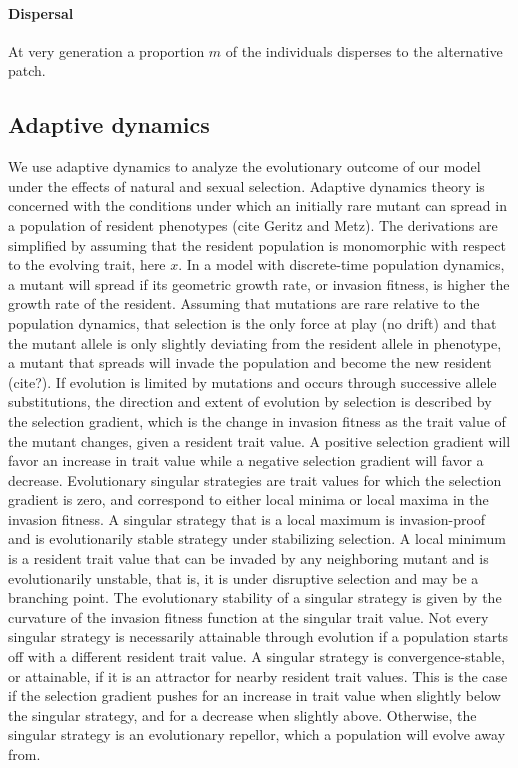 \paragraph{Dispersal} At very generation a proportion $m$ of the individuals disperses to the alternative patch.

\subsection*{Adaptive dynamics}

We use adaptive dynamics to analyze the evolutionary outcome of our model under the effects of natural and sexual selection. Adaptive dynamics theory is concerned with the conditions under which an initially rare mutant can spread in a population of resident phenotypes (cite Geritz and Metz). The derivations are simplified by assuming that the resident population is monomorphic with respect to the evolving trait, here $x$. In a model with discrete-time population dynamics, a mutant will spread if its geometric growth rate, or invasion fitness, is higher the growth rate of the resident. Assuming that mutations are rare relative to the population dynamics, that selection is the only force at play (no drift) and that the mutant allele is only slightly deviating from the resident allele in phenotype, a mutant that spreads will invade the population and become the new resident (cite?). If evolution is limited by mutations and occurs through successive allele substitutions, the direction and extent of evolution by selection is described by the selection gradient, which is the change in invasion fitness as the trait value of the mutant changes, given a resident trait value. A positive selection gradient will favor an increase in trait value while a negative selection gradient will favor a decrease. Evolutionary singular strategies are trait values for which the selection gradient is zero, and correspond to either local minima or local maxima in the invasion fitness. A singular strategy that is a local maximum is invasion-proof and is evolutionarily stable strategy under stabilizing selection. A local minimum is a resident trait value that can be invaded by any neighboring mutant and is evolutionarily unstable, that is, it is under disruptive selection and may be a branching point. The evolutionary stability of a singular strategy is given by the curvature of the invasion fitness function at the singular trait value. Not every singular strategy is necessarily attainable through evolution if a population starts off with a different resident trait value. A singular strategy is convergence-stable, or attainable, if it is an attractor for nearby resident trait values. This is the case if the selection gradient pushes for an increase in trait value when slightly below the singular strategy, and for a decrease when slightly above. Otherwise, the singular strategy is an evolutionary repellor, which a population will evolve away from.\\

